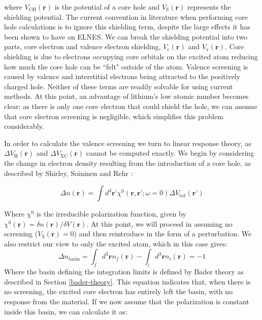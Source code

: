where $V_{\mathrm{CH}}(\textbf{r})$ is the potential of a core hole and  $V_{\mathrm{S}}(\textbf{r})$ represents the shielding potential.  The current convention in literature when performing core hole calculations is to ignore this shielding term, despite the large effects it has been shown to have on ELNES.  We can break the shielding potential into two parts, core electron and valence electron shielding, $V_{\mathrm{c}}(\textbf{r})$ and  $V_{\mathrm{v}}(\textbf{r})$. Core shielding is due to electrons occupying core orbitals on the excited atom reducing how much the core hole can be ``felt" outside of the atom.  Valence screening is caused by valence and interstitial electrons being attracted to the positively charged hole.  Neither of these terms are readily solvable for using current methods.  At this point, an advantage of lithium's low atomic number becomes clear: as there is only one core electron that could shield the hole, we can assume that core electron screening is negligible, which simplifies this problem considerably.  

In order to calculate the valence screening we turn to linear response theory, as  $\Delta V_{\mathrm{H}}(\textbf{r})$ and $\Delta V_{\mathrm{XC}}(\textbf{r})$ cannot be computed exactly.  We begin by considering the change in electron density resulting from the introduction of a core hole, as described by Shirley, Soininen and Rehr \cite{shirley_modeling_2005}:

\begin{equation}
\Delta n(\textbf{r}) = \int d^3 \textbf{r'} \chi^0(\textbf{r},\textbf{r'}; \omega = 0)\Delta V_{\mathrm{tot}}(\textbf{r'})
\end{equation}

Where $\chi^0$ is the irreducible polarization function, given by $\chi^0(\textbf{r}) = \delta n(\textbf{r}) /  \delta V(\textbf{r})$.  At this point, we will proceed in assuming no screening ($V_{\mathrm{S}}(\textbf{r})=0$) and then reintroduce in the form of a perturbation.  We also restrict our view to only the excited atom, which in this case gives:
\begin{equation}
\Delta n _{\mathrm{basin}} = \int_{f}d^3\textbf{r} n_{f}(\textbf{r}) - \int_{i}d^3\textbf{r} n_i(\textbf{r})= -1
\label{density_calc}
\end{equation}
Where the basin defining the integration limits is defined by Bader theory as described in Section \ref{bader-theory}. This equation indicates that, when there is no screening,  the excited core electron has entirely left the basin, with no response from the material. If we now assume that the polarization is constant inside this basin, we can calculate it as: 

